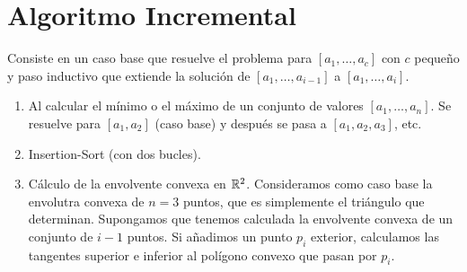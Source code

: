 \documentclass[AL.tex]{subfiles}
\begin{document}
\section{Algoritmo Incremental}
Consiste en un caso base que resuelve el problema para $[a_1,\dots, a_c]$ con $c$ pequeño y paso inductivo que extiende la solución de $[a_1,\dots, a_{i-1}]$ a $[a_1,\dots, a_i]$. 
\begin{ejs}
\begin{enumerate}
\item
 Al calcular el mínimo o el máximo de un conjunto de valores $[a_1,\dots, a_n]$. Se resuelve para $[a_1,a_2]$ (caso base) y después se pasa a $[a_1,a_2,a_3]$, etc. 
 
 \item Insertion-Sort (con dos bucles).
 
 \item Cálculo de la envolvente convexa en $\mathbb{R}^2$. Consideramos como caso base la envolutra convexa de $n=3$ puntos, que es simplemente el triángulo que determinan. Supongamos que tenemos calculada la envolvente convexa de un conjunto de $i-1$ puntos. Si añadimos un punto $p_i$ exterior, calculamos las tangentes superior e inferior al polígono convexo que pasan por $p_i$. 

\end{enumerate}
\end{ejs}
\end{document}
